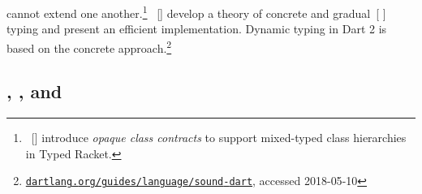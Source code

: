 \documentclass[screen=true, 10pt, acmsmall]{acmart}
\makeatletter
\newcommand{\Scribtexttt}[1]{{\texttt{#1}}}
\newcommand{\Sendabbrev}[1]{#1\@}
\let\SOriginalthesubsubsection\thesubsubsection
\newcommand{\Ssubsection}[2]{\subsection[#1]{#2}\let\thesubsubsection\SOriginalthesubsubsection}
\newcommand{\AutobibLink}[1]{\color{ACMPurple}{#1}}
\newcommand{\NoteBox}[1]{\footnote{#1}}
\newcommand{\NoteContent}[1]{#1}
\newcommand{\Autobibref}[1]{#1}
\providecommand{\AutobibLink}[1]{#1}
\newcommand{\HOlong}{Higher-Order}
\newcommand{\EOlong}{Erasure}
\newcommand{\FOlong}{First-Order}
\makeatother
\begin{document}
 cannot extend one another.\NoteBox{\NoteContent{\Autobibref{\hyperref[t:x28autobib_x22Asumu_Takikawax2c_Tx2e_Stephen_Stricklandx2c_Christos_Dimoulasx2c_Sam_Tobinx2dHochstadtx2c_and_Matthias_FelleisenGradual_Typing_for_Firstx2dClass_ClassesConference_on_Objectx2dOriented_Programmingx2c_Systemsx2c_Languages_and_Applicationsx2c_ppx2e_793x2dx2d8102012x22x29]{\AutobibLink{Takikawa et al\Sendabbrev{.}}}~[\hyperref[t:x28autobib_x22Asumu_Takikawax2c_Tx2e_Stephen_Stricklandx2c_Christos_Dimoulasx2c_Sam_Tobinx2dHochstadtx2c_and_Matthias_FelleisenGradual_Typing_for_Firstx2dClass_ClassesConference_on_Objectx2dOriented_Programmingx2c_Systemsx2c_Languages_and_Applicationsx2c_ppx2e_793x2dx2d8102012x22x29]{\AutobibLink{2012}}]} introduce
\textit{opaque class contracts} to support mixed{-}typed class hierarchies in Typed Racket.}}
\Autobibref{\hyperref[t:x28autobib_x22Fabian_Muehlboeck_and_Ross_TateSound_Gradual_Typing_is_Nominally_Alive_and_WellProceedings_of_the_ACM_on_Programming_Languages_1x28OOPSLAx29x2c_ppx2e_56x3a1x2dx2d56x3a302017x22x29]{\AutobibLink{Muehlboeck and Tate}}~[\hyperref[t:x28autobib_x22Fabian_Muehlboeck_and_Ross_TateSound_Gradual_Typing_is_Nominally_Alive_and_WellProceedings_of_the_ACM_on_Programming_Languages_1x28OOPSLAx29x2c_ppx2e_56x3a1x2dx2d56x3a302017x22x29]{\AutobibLink{2017}}]} develop a theory of concrete and gradual\Autobibref{~[\hyperref[t:x28autobib_x22Jeremy_Gx2e_Siekx2c_Michael_Mx2e_Vitousekx2c_Matteo_Ciminix2c_and_John_Tang_BoylandRefined_Criteria_for_Gradual_TypingSummit_oN_Advances_in_Programming_Languagesx2c_ppx2e_274x2dx2d2932015x22x29]{\AutobibLink{Siek et al\Sendabbrev{.}}} \hyperref[t:x28autobib_x22Jeremy_Gx2e_Siekx2c_Michael_Mx2e_Vitousekx2c_Matteo_Ciminix2c_and_John_Tang_BoylandRefined_Criteria_for_Gradual_TypingSummit_oN_Advances_in_Programming_Languagesx2c_ppx2e_274x2dx2d2932015x22x29]{\AutobibLink{2015}}]}
 typing and present an efficient implementation.
Dynamic typing in Dart 2 is based on the concrete approach.\NoteBox{\NoteContent{\href{https://www.dartlang.org/guides/language/sound-dart}{\Scribtexttt{dartlang{\hbox{\texttt{.}}}org/guides/language/sound{-}dart}}, accessed 2018{-}05{-}10}}

\Ssubsection{\relax{\HOlong}, \relax{\EOlong}, and \relax{\FOlong}}{\relax{\HOlong}, \relax{\EOlong}, and \relax{\FOlong}}\label{t:x28part_x22x5fHOlongx5fx5fx5fEOlongx5fx5fandx5fx5fFOlongx22x29}
\end{document}
